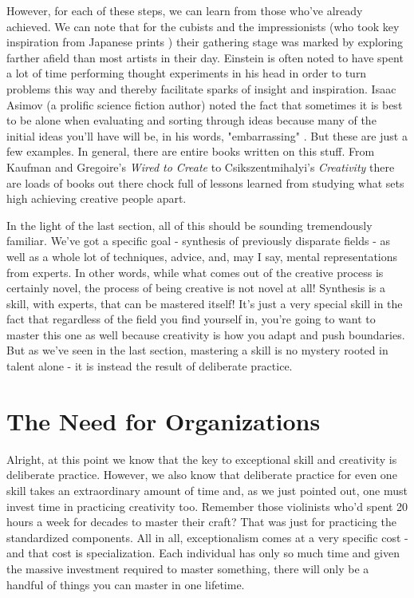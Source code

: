\documentclass[11pt]{book}
\begin{document}
However, for each of these steps, we can learn from those who've already achieved. We can note that for the cubists and the impressionists (who took key inspiration from Japanese prints \cite{impressionism}) their gathering stage was marked by exploring farther afield than most artists in their day. Einstein is often noted to have spent a lot of time performing thought experiments in his head in order to turn problems this way and thereby facilitate sparks of insight and inspiration. Isaac Asimov (a prolific science fiction author) noted the fact that sometimes it is best to be alone when evaluating and sorting through ideas because many of the initial ideas you'll have will be, in his words, "embarrassing" \cite{kaufman}. But these are just a few examples. In general, there are entire books written on this stuff. From Kaufman and Gregoire's \textit{Wired to Create} \cite{kaufman} to Csikszentmihalyi's \textit{Creativity} \cite{creativity} there are loads of books out there chock full of lessons learned from studying what sets high achieving creative people apart.
\newline

In the light of the last section, all of this should be sounding tremendously familiar. We've got a specific goal - synthesis of previously disparate fields - as well as a whole lot of techniques, advice, and, may I say, mental representations from experts. In other words, while what comes out of the creative process is certainly novel, the process of being creative is not novel at all! Synthesis is a skill, with experts, that can be mastered itself! It's just a very special skill in the fact that regardless of the field you find yourself in, you're going to want to master this one as well because creativity is how you adapt and push boundaries. But as we've seen in the last section, mastering a skill is no mystery rooted in talent alone - it is instead the result of deliberate practice. 

\section{The Need for Organizations}
Alright, at this point we know that the key to exceptional skill and creativity is deliberate practice. However, we also know that deliberate practice for even one skill takes an extraordinary amount of time and, as we just pointed out, one must invest time in practicing creativity too. Remember those violinists who'd spent 20 hours a week for decades to master their craft? That was just for practicing the standardized components. All in all, exceptionalism comes at a very specific cost - and that cost is specialization. Each individual has only so much time and given the massive investment required to master something, there will only be a handful of things you can master in one lifetime.
\newline
\end{document}
